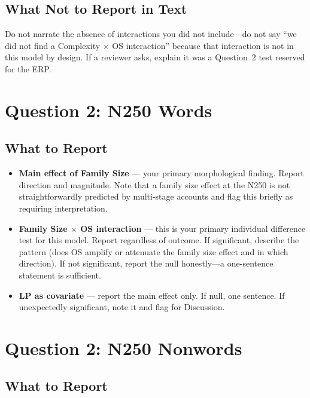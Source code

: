 \documentclass[12pt]{article}
\begin{document}
\subsection*{What Not to Report in Text}

Do not narrate the absence of interactions you did not include---do not say ``we did not find a Complexity $\times$ OS interaction'' because that interaction is not in this model by design. If a reviewer asks, explain it was a Question~2 test reserved for the ERP.

\section*{Question 2: N250 Words}

\subsection*{What to Report}

\begin{itemize}
    \item \textbf{Main effect of Family Size} --- your primary morphological finding. Report direction and magnitude. Note that a family size effect at the N250 is not straightforwardly predicted by multi-stage accounts and flag this briefly as requiring interpretation.
    \item \textbf{Family Size $\times$ OS interaction} --- this is your primary individual difference test for this model. Report regardless of outcome. If significant, describe the pattern (does OS amplify or attenuate the family size effect and in which direction). If not significant, report the null honestly---a one-sentence statement is sufficient.
    \item \textbf{LP as covariate} --- report the main effect only. If null, one sentence. If unexpectedly significant, note it and flag for Discussion.
\end{itemize}

\section*{Question 2: N250 Nonwords}

\subsection*{What to Report}
\end{document}
